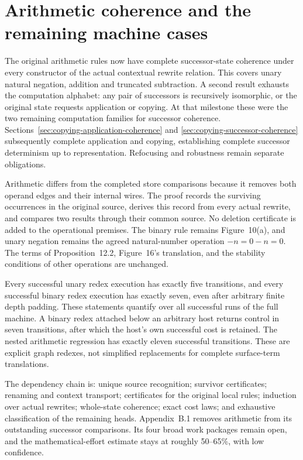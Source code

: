 \clearpage
\section{Arithmetic coherence and the remaining machine cases}
\label{sec:copying-arithmetic-coherence}
The original arithmetic rules now have complete successor-state coherence
under every constructor of the actual contextual rewrite relation. This covers
unary natural negation, addition and truncated subtraction. A second result
exhausts the computation alphabet: any pair of successors is recursively
isomorphic, or the original state requests application or copying. At that milestone these were
the two remaining computation families for successor coherence.
Sections~\ref{sec:copying-application-coherence} and
\ref{sec:copying-successor-coherence} subsequently complete application and
copying, establishing complete successor determinism up to representation.
Refocusing and robustness remain separate obligations.

Arithmetic differs from the completed store comparisons because it removes
both operand edges and their internal wires. The proof records the surviving
occurrences in the original source, derives this record from every actual
rewrite, and compares two results through their common source. No deletion
certificate is added to the operational premises. The binary rule remains
Figure~10(a), and unary negation remains the agreed natural-number operation
$-n=0-n=0$. The terms of Proposition~12.2, Figure~16's translation, and the
stability conditions of other operations are unchanged.

Every successful unary redex execution has exactly five transitions, and every
successful binary redex execution has exactly seven, even after arbitrary finite
depth padding. These statements quantify over all successful runs of the full
machine. A binary redex attached below an arbitrary host returns control in
seven transitions, after which the host's own successful cost is retained.
The nested arithmetic regression has exactly eleven successful transitions.
These are explicit graph redexes, not simplified replacements for complete
surface-term translations.

The dependency chain is: unique source recognition; survivor certificates;
renaming and context transport; certificates for the original local rules;
induction over actual rewrites; whole-state coherence; exact cost laws; and
exhaustive classification of the remaining heads. Appendix~B.1 removes
arithmetic from its outstanding successor comparisons. Its four broad work
packages remain open, and the mathematical-effort estimate stays at roughly
50--65\%, with low confidence.

